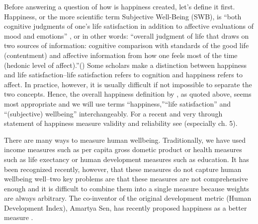 \documentclass[10pt, letterpaper]{article}
\begin{document}
\begin{spacing}{1.4}
Before answering a question of how is happiness created, let's define it first. 
  Happiness, or the more scientific term Subjective Well-Being (SWB), is ``both cognitive judgments of one's life
satisfaction in addition to affective evaluations of mood and
emotions'' \citep[p. 142]{steel08},  or in other words: ``overall judgment of life that draws on two sources of information:
  cognitive comparison with standards of the good life (contentment) and
  affective information from how one feels most of the time (hedonic
  level of affect).''(\citep[p. 2]{veenhoven08})
 Some scholars make a
  distinction between happiness and life satisfaction--life
  satisfaction refers to cognition and happiness refers to affect. In practice,
  however, it is usually difficult  if not impossible to separate the two
  concepts.  Hence, the overall happiness definition by 
   \citet{veenhoven08}, as quoted above,  seems most appropriate and we will use terms
   ``happiness,''``life satisfaction'' and ``(subjective) wellbeing'' interchangeably.  For a recent and very through statement of
happiness measure validity and reliability see \citet{diener09}
(especially ch. 5). 

There are many ways to measure human wellbeing. Traditionally, we have used
income measures such as per capita gross dometic product or health measures such
as life exectancy or human development measures such as education. %
 It has been recognized recently, however, that these measures do not capture
 human wellbeing well--two key problems are that these measures are not
 comprehensive enough and it is difficult to combine them into a single measure
 because weights are always arbitrary. The co-inventor of the original
 development metric (Human Development Index), Amartya Sen, has recently
 proposed happiness as a better measure \citep{stiglitz09al}.


\end{spacing}
\end{document}
